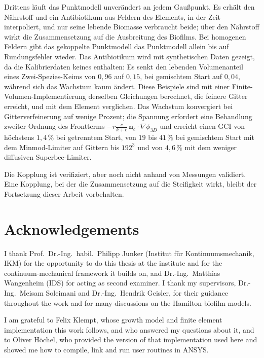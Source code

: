 \documentclass[12pt, a4paper, twoside]{report}
\newcommand{\fterm}{\ensuremath{-r\tfrac{c}{k+c}\,\mathbf n_c\cdot\nabla\phi_{3D}}}
\begin{document}
Drittens läuft das Punktmodell unverändert an jedem Gaußpunkt. Es erhält den
Nährstoff und ein Antibiotikum aus Feldern des Elements, in der Zeit
interpoliert, und nur seine lebende Biomasse verbraucht beide; über den
Nährstoff wirkt die Zusammensetzung auf die Ausbreitung des Biofilms. Bei
homogenen Feldern gibt das gekoppelte Punktmodell das Punktmodell allein bis auf
Rundungsfehler wieder. Das Antibiotikum wird mit synthetischen Daten gezeigt, da
die Kalibrierdaten keines enthalten: Es senkt den lebenden Volumenanteil eines
Zwei-Spezies-Keims von $0{,}96$ auf $0{,}15$, bei gemischtem Start auf $0{,}04$,
während sich das Wachstum kaum ändert. Diese Beispiele sind mit einer
Finite-Volumen-Implementierung derselben Gleichungen berechnet, die feinere
Gitter erreicht, und mit dem Element verglichen. Das Wachstum konvergiert bei
Gitterverfeinerung auf wenige Prozent; die Spannung erfordert eine Behandlung
zweiter Ordnung des Frontterms \fterm{} und erreicht einen GCI von höchstens
$1{,}4\,\%$ bei getrenntem Start, von $19$ bis $41\,\%$ bei gemischtem Start mit
dem Minmod-Limiter auf Gittern bis $192^3$ und von $4{,}6\,\%$ mit dem weniger
diffusiven Superbee-Limiter.

Die Kopplung ist verifiziert, aber noch nicht anhand von Messungen validiert.
Eine Kopplung, bei der die Zusammensetzung auf die Steifigkeit wirkt, bleibt der
Fortsetzung dieser Arbeit vorbehalten.
\fi %

\newpage
\chapter*{Acknowledgements}
I thank Prof.\ Dr.-Ing.\ habil.\ Philipp Junker (Institut für
Kontinuumsmechanik, IKM) for the opportunity to do this thesis at the institute
and for the continuum-mechanical framework it builds on, and Dr.-Ing.\ Matthias
Wangenheim (IDS) for acting as second examiner. I thank my supervisors,
Dr.-Ing.\ Meisam Soleimani and Dr.-Ing.\ Hendrik Geisler, for their guidance
throughout the work and for many discussions on the Hamilton biofilm models.

I am grateful to Felix Klempt, whose growth model and finite element
implementation this work follows, and who answered my questions about it, and
to Oliver Höchel, who provided the version of that implementation used here and
showed me how to compile, link and run user routines in ANSYS.
\end{document}
